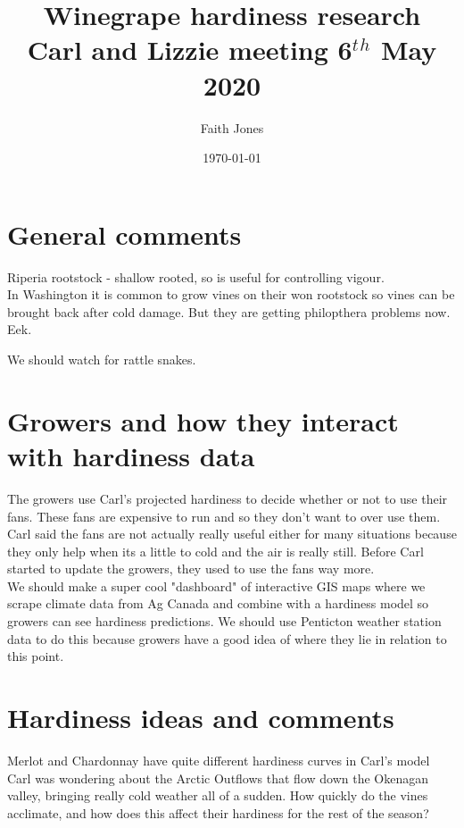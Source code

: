 \documentclass[11pt,letter]{article}
\title{Winegrape hardiness research \\ Carl and Lizzie meeting 6$^t$$^h$ May 2020 }
\date{\today}
\author{Faith Jones}
\begin{document}
\maketitle


\section{General comments}
Riperia rootstock - shallow rooted, so is useful for controlling vigour.\\

In Washington it is common to grow vines on their won rootstock so vines can be brought back after cold damage. But they are getting philopthera problems now. Eek.

We should watch for rattle snakes.  

\section{Growers and how they interact with hardiness data}
The growers use Carl's projected hardiness to decide whether or not to use their fans. These fans are expensive to run and so they don't want to over use them. Carl said the fans are not actually really useful either for many situations because they only help when its a little to cold and the air is really still. Before Carl started to update the growers, they used to use the fans way more. \\ 

We should make a super cool "dashboard" of interactive GIS maps where we scrape climate data from Ag Canada and combine with a hardiness model so growers can see hardiness predictions. We should use Penticton weather station data to do this because growers have a good idea of where they lie in relation to this point.\\

\section{Hardiness ideas and comments}
Merlot and Chardonnay have quite different hardiness curves in Carl's model \\

Carl was wondering about the Arctic Outflows that flow down the Okenagan valley, bringing really cold weather all of a sudden. How quickly do the vines acclimate, and how does this affect their hardiness for the rest of the season? \\
\end{document}
